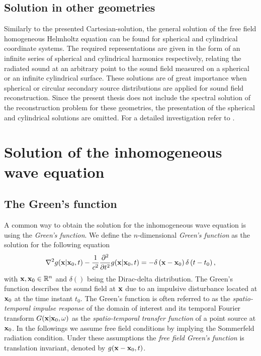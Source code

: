 %
\subsection{Solution in other geometries}
Similarly to the presented Cartesian-solution, the general solution of the free field homogeneous Helmholtz equation can be found for spherical and cylindrical coordinate systems. 
The required representations are given in the form of an infinite series of spherical and cylindrical harmonics respectively, relating the radiated sound at an arbitrary point to the sound field measured on a spherical or an infinite cylindrical surface.
These solutions are of great importance when spherical or circular secondary source distributions are applied for sound field reconstruction. 
Since the present thesis does not include the spectral solution of the reconstruction problem for these geometries, the presentation of the spherical and cylindrical solutions are omitted. 
For a detailed investigation refer to \cite{Williams1999, Zotter2009phd, Ahrens2012}.
%
%
%
%
%
%
%
%
%
%
%
%
\newpage
\section{Solution of the inhomogeneous wave equation}

\subsection{The Green's function}
A common way to obtain the solution for the inhomogeneous wave equation is using the \emph{Green's function}. 
We define the $n$-dimensional \emph{Green's function} as the solution for the following equation \cite{Gumerov2004, Williams1999}
\begin{equation}
\nabla^2 g(\mathbf{x}|\mathbf{x}_0,t) -\frac{1}{c^2}\frac{\partial^2}{\partial t^2} g(\mathbf{x}|\mathbf{x}_0,t) = -\delta\left( \mathbf{x} - \mathbf{x}_0 \right)\delta\left( t - t_0 \right),
\label{Eq:Theory:Green_function_def}
\end{equation}
with $\mathbf{x}, \mathbf{x}_0 \in \mathbb{R}^{n}$ and $\delta()$ being the Dirac-delta distribution. 
The Green's function describes the sound field at $\mathbf{x}$ due to an impulsive disturbance located at $\mathbf{x}_0$ at the time instant $t_0$.
The Green's function is often referred to as the \emph{spatio-temporal impulse response} of the domain of interest and its temporal Fourier transform $G(\mathbf{x}|\mathbf{x}_0,\omega)$ as the \emph{spatio-temporal transfer function} of a point source at $\mathbf{x}_0$. 
In the followings we assume free field conditions by implying the Sommerfeld radiation condition. 
Under these assumptions the \emph{free field Green's function} is translation invariant, denoted by $g(\mathbf{x}-\mathbf{x}_0,t)$.

